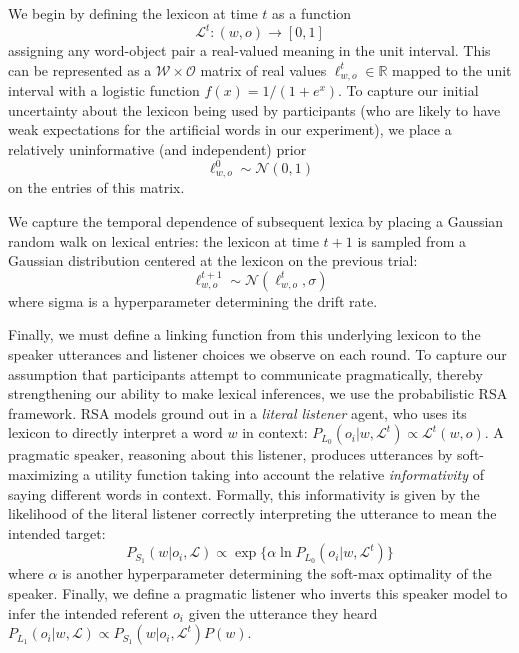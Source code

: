 \documentclass[10pt,letterpaper]{article}
\begin{document}
We begin by defining the lexicon at time $t$ as a function 
$$\mathcal{L}^{t} : (w, o) \rightarrow [0,1]$$ 
assigning any word-object pair a real-valued meaning in the unit interval. This can be represented as a $\mathcal{W} \times \mathcal{O}$ matrix of real values $\ell_{w,o}^t \in \mathbb{R}$ mapped to the unit interval with a logistic function $f(x) = 1/(1 + e^{x})$. To capture our initial uncertainty about the lexicon being used by participants (who are likely to have weak expectations for the artificial words in our experiment), we place a relatively uninformative (and independent) prior $$\ell_{w,o}^0 \sim \mathcal{N}(0, 1)$$ on the entries of this matrix. 

We capture the temporal dependence of subsequent lexica by placing a Gaussian random walk on lexical entries: the lexicon at time $t+1$ is sampled from a Gaussian distribution centered at the lexicon on the previous trial: $$\ell_{w,o}^{t+1} \sim \mathcal{N}(\ell_{w,o}^t, \sigma)$$ where sigma is a hyperparameter determining the drift rate. 

Finally, we must define a linking function from this underlying lexicon to the speaker utterances and listener choices we observe on each round. To capture our assumption that participants attempt to communicate pragmatically, thereby strengthening our ability to make lexical inferences, we use the probabilistic RSA framework. RSA models ground out in a \emph{literal listener} agent, who uses its lexicon to directly interpret a word $w$ in context: $P_{L_0}(o_i | w, \mathcal{L}^t) \propto \mathcal{L}^t(w,o)$. A pragmatic speaker, reasoning about this listener, produces utterances by soft-maximizing a utility function taking into account the relative \emph{informativity} of saying different words in context. Formally, this informativity is given by the likelihood of the literal listener correctly interpreting the utterance to mean the intended target: $$P_{S_1}(w | o_i, \mathcal{L}) \propto \exp\{\alpha \ln P_{L_0}(o_i | w, \mathcal{L}^t)\}$$
where $\alpha$ is another hyperparameter determining the soft-max optimality of the speaker. Finally, we define a pragmatic listener who inverts this speaker model to infer the intended referent $o_i$ given the utterance they heard $P_{L_1}(o_i | w, \mathcal{L}) \propto P_{S_1}(w | o_i, \mathcal{L}^t) P(w)$.
\end{document}

